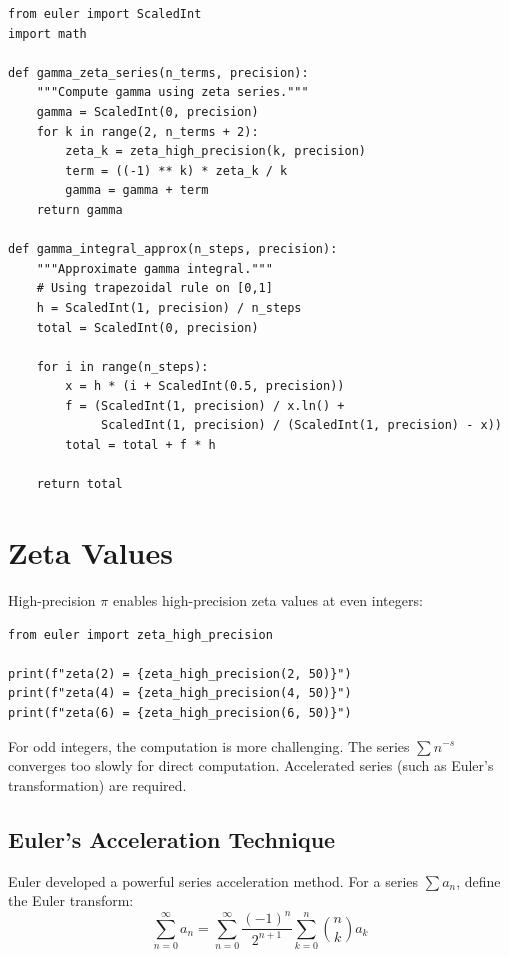 \begin{lstlisting}[caption={Alternative gamma computation}, label=lst:gamma_alt]
from euler import ScaledInt
import math

def gamma_zeta_series(n_terms, precision):
    """Compute gamma using zeta series."""
    gamma = ScaledInt(0, precision)
    for k in range(2, n_terms + 2):
        zeta_k = zeta_high_precision(k, precision)
        term = ((-1) ** k) * zeta_k / k
        gamma = gamma + term
    return gamma

def gamma_integral_approx(n_steps, precision):
    """Approximate gamma integral."""
    # Using trapezoidal rule on [0,1]
    h = ScaledInt(1, precision) / n_steps
    total = ScaledInt(0, precision)
    
    for i in range(n_steps):
        x = h * (i + ScaledInt(0.5, precision))
        f = (ScaledInt(1, precision) / x.ln() + 
             ScaledInt(1, precision) / (ScaledInt(1, precision) - x))
        total = total + f * h
    
    return total
\end{lstlisting}

\section{Zeta Values}

High-precision $\pi$ enables high-precision zeta values at even integers:

\begin{lstlisting}[caption={High-precision zeta values}, label=lst:zeta_hp]
from euler import zeta_high_precision

print(f"zeta(2) = {zeta_high_precision(2, 50)}")
print(f"zeta(4) = {zeta_high_precision(4, 50)}")
print(f"zeta(6) = {zeta_high_precision(6, 50)}")
\end{lstlisting}

For odd integers, the computation is more challenging. The series $\sum n^{-s}$ converges
too slowly for direct computation. Accelerated series (such as Euler's transformation)
are required.

\subsection{Euler's Acceleration Technique}

Euler developed a powerful series acceleration method. For a series $\sum a_n$,
define the Euler transform:
\[
\sum_{n=0}^{\infty} a_n = \sum_{n=0}^{\infty} \frac{(-1)^n}{2^{n+1}} \sum_{k=0}^{n} \binom{n}{k} a_k
\]

